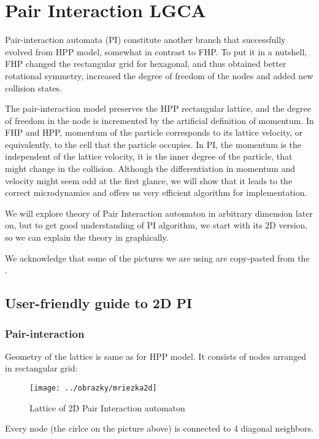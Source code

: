\chapter{Pair Interaction LGCA}
Pair-interaction automata (PI) constitute another branch that successfully evolved from HPP model, somewhat in contrast to FHP.
To put it in a nutshell, FHP changed the rectangular grid for hexagonal, and thus obtained better rotational symmetry, increased the degree of freedom of the nodes and added new collision states. 

The pair-interaction model preserves the HPP rectangular lattice, and the degree of freedom in the node is incremented by the artificial definition of momentum.
In FHP and HPP, momentum of the particle corresponds to its lattice velocity, or equivalently, to the cell that the particle occupies.
In PI, the momentum is the independent of the lattice velocity, it is the inner degree of the particle, that might change in the collision. 
Although the differentiation in momentum and velocity might seem odd at the first glance, we will show that it leads to the correct microdynamics and offers us very efficient algorithm for implementation.

\bigskip
We will explore theory of Pair Interaction automaton in arbitrary dimension later on, but to get good understanding of PI algorithm, we start with its $2$D version, so we can explain the theory in graphically.

We acknowledge that some of the pictures we are using are copy-pasted from the \cite{wolf}.

\section{User-friendly guide to 2D PI}

\subsection{Pair-interaction}

Geometry of the lattice is same as for HPP model. It consists of nodes arranged in rectangular grid:

\begin{figure}[htbp]
 \centering 
 \texttt{[image: ../obrazky/mriezka2d]}
 \label{2dgrid}
 \caption{Lattice of 2D Pair Interaction automaton}
\end{figure}

Every node (the cirlce on the picture above) is connected to 4 diagonal neighbors.

